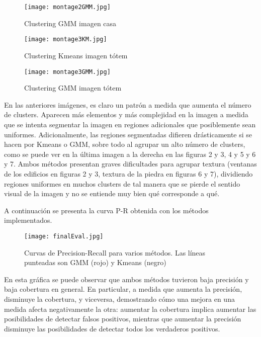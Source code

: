 \documentclass[10pt,twocolumn,letterpaper]{article}
\begin{document}
\begin{figure}[H]
\centering
\texttt{[image: montage2GMM.jpg]}
\caption{Clustering GMM imagen casa}
\end{figure}

\begin{figure}[H]
\centering
\texttt{[image: montage3KM.jpg]}
\caption{Clustering Kmeans imagen tótem}
\end{figure}

\begin{figure}[H]
\centering
\texttt{[image: montage3GMM.jpg]}
\caption{Clustering GMM imagen tótem}
\end{figure}


En las anteriores imágenes, es claro un patrón a medida que aumenta el número de clusters. Aparecen más elementos y más complejidad en la imagen a medida que se intenta segmentar la imagen en regiones adicionales que posiblemente sean uniformes. Adicionalmente, las regiones segmentadas difieren drásticamente si se hacen por Kmeans o GMM, sobre todo al agrupar un alto número de clusters, como se puede ver en la última imagen a la derecha en las figuras 2 y 3, 4 y 5 y 6 y 7. Ambos métodos presentan graves dificultades para agrupar textura (ventanas de los edificios en figuras 2 y 3, textura de la piedra en figuras 6 y 7), dividiendo regiones uniformes en muchos clusters de tal manera que se pierde el sentido visual de la imagen y no se entiende muy bien qué corresponde a qué. 

A continuación se presenta la curva P-R obtenida con los métodos implementados. 
\begin{figure}[H]
\centering
\texttt{[image: finalEval.jpg]}
\caption{Curvas de Precision-Recall para varios métodos. Las líneas punteadas son GMM (rojo) y Kmeans (negro) }
\end{figure}

En esta gráfica se puede observar que ambos métodos tuvieron baja precisión y baja cobertura en general. En particular, a medida que aumenta la precisión, disminuye la cobertura, y viceversa, demostrando cómo una mejora en una medida afecta negativamente la otra: aumentar la cobertura implica aumentar las posibilidades de detectar falsos positivos, mientras que aumentar la precisión disminuye las posibilidades de detectar todos los verdaderos positivos. 
\end{document}

